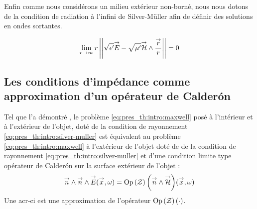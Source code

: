 Enfin comme nous considérons un milieu extérieur non-borné, nous nous dotons de la condition de radiation à l'infini de Silver-Müller afin de définir des solutions en ondes sortantes.


\begin{equation}
\label{eq:pres_th:intro:silver-muller}
\lim_{r\rightarrow\infty} r \left|\left|\sqrt{\epsilon'}{\overset{\rightarrow}{E}} - \sqrt{\mu'}{\overset{\rightarrow}{\mathcal{H}}}\wedge\dfrac{{\overset{\rightarrow}{r}}}{r}\right|\right| = 0
\end{equation}

\subsection*{Les conditions d'impédance comme approximation d'un opérateur de Calderón}

Tel que l'a démontré \cite[p.~109]{cessenat_mathematical_1996}, le problème \eqref{eq:pres_th:intro:maxwell}  posé à l'intérieur et à l'extérieur de l'objet, doté de la condition de rayonnement \eqref{eq:pres_th:intro:silver-muller} est équivalent au problème \eqref{eq:pres_th:intro:maxwell} à l'extérieur de l'objet doté de de la condition de rayonnement \eqref{eq:pres_th:intro:silver-muller} et d'une condition limite type opérateur de Calderón sur la surface extérieur de l'objet :
\begin{equation}
\label{eq:pres_th:ci:ci-calderon}
{\overset{\rightarrow}{n}} \wedge {\overset{\rightarrow}{n}} \wedge {\overset{\rightarrow}{E}} ({\overset{\rightarrow}{x}} , \omega ) = {\operatorname{Op}\left(\mathcal Z\right)\left({\overset{\rightarrow}{n}} \wedge {\overset{\rightarrow}{\mathcal{H}}} \right)}({\overset{\rightarrow}{x}}, \omega )
\end{equation}
Une \gls{acr-ci} est une approximation de l'opérateur \({\operatorname{Op}\left(\mathcal Z\right)\left(\cdot\right)}\).






